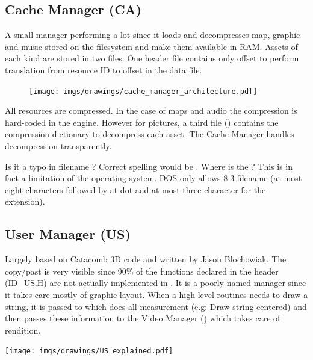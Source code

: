 \documentclass[book.tex]{subfiles}
\begin{document}
\subsection{Cache Manager (CA)}
A small manager performing a lot since it loads and decompresses map, graphic and music stored on the filesystem and make them available in RAM. Assets of each kind are stored in two files. One header file contains only offset to perform translation from resource ID to offset in the data file.\\
 \par
\begin{figure}[H]
\centering
 \texttt{[image: imgs/drawings/cache\_manager\_architecture.pdf]}
 \end{figure}
 \par
{} All resources are compressed. In the case of maps and audio the compression is hard-coded in the engine. However for pictures, a third file () contains the compression dictionary to decompress each asset. The Cache Manager handles decompression transparently.\\
\par
{} Is it a typo in filename  ? Correct spelling would be . Where is the ? This is in fact a limitation of the operating system. DOS only allows 8.3 filename (at most eight characters followed by at dot and at most three character for the extension).








\subsection{User Manager (US)}
\begin{minipage}{0.7\textwidth}
Largely based on Catacomb 3D code and written by Jason Blochowiak. The copy/past is very visible since 90\% of the functions declared in the header (ID\_US.H) are not actually implemented in . 
It is a poorly named manager since it takes care mostly of graphic layout. When a  high level routines needs to draw a string, it is passed to  which does all measurement (e.g: Draw string centered)
and then passes these information to the Video Manager () which takes care of rendition.
\end{minipage}
\begin{minipage}{0.3\textwidth}
\begin{flushright}
\texttt{[image: imgs/drawings/US\_explained.pdf]}
\end{flushright}
\end{minipage}
\noindent
\\
\end{document}
